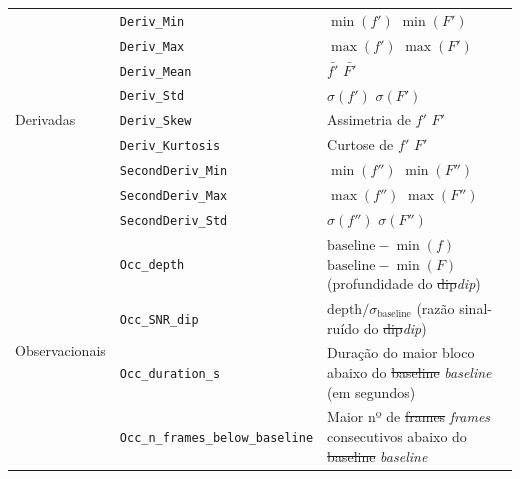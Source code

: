 \documentclass[msc]{on} %
\makeatletter
\providecommand{\DIFaddtex}[1]{{\protect\color{red}#1}} %
\providecommand{\DIFdeltex}[1]{{\protect\color{red}\sout{#1}}} %
\providecommand{\DIFaddFL}[1]{\DIFadd{#1}} %
\providecommand{\DIFdelFL}[1]{\DIFdel{#1}} %
\providecommand{\DIFaddbeginFL}{} %
\providecommand{\DIFaddendFL}{} %
\providecommand{\DIFdelbeginFL}{} %
\providecommand{\DIFdelendFL}{} %
\providecommand{\DIFadd}[1]{\texorpdfstring{\DIFaddtex{#1}}{#1}} %
\providecommand{\DIFdel}[1]{\texorpdfstring{\DIFdeltex{#1}}{}} %
\let\sout@orig\sout %
\renewcommand{\sout}[1]{\ifmmode\text{\sout@orig{\ensuremath{#1}}}\else\sout@orig{#1}\fi} %
\makeatother
\begin{document}
\begin{table}[htbp]
\begin{tabular}{llp{7.5cm}}
\hline
\multirow{9}{*}{Derivadas}
& \texttt{Deriv\_Min} & \DIFdelbeginFL \DIFdelFL{$\min(f')$ }\DIFdelendFL \DIFaddbeginFL \DIFaddFL{$\min(F')$ }\DIFaddendFL \\
& \texttt{Deriv\_Max} & \DIFdelbeginFL \DIFdelFL{$\max(f')$ }\DIFdelendFL \DIFaddbeginFL \DIFaddFL{$\max(F')$ }\DIFaddendFL \\
& \texttt{Deriv\_Mean} & \DIFdelbeginFL \DIFdelFL{$\bar{f'}$ }\DIFdelendFL \DIFaddbeginFL \DIFaddFL{$\bar{F'}$ }\DIFaddendFL \\
& \texttt{Deriv\_Std} & \DIFdelbeginFL \DIFdelFL{$\sigma(f')$ }\DIFdelendFL \DIFaddbeginFL \DIFaddFL{$\sigma(F')$ }\DIFaddendFL \\
& \texttt{Deriv\_Skew} & Assimetria de \DIFdelbeginFL \DIFdelFL{$f'$ }\DIFdelendFL \DIFaddbeginFL \DIFaddFL{$F'$ }\DIFaddendFL \\
& \texttt{Deriv\_Kurtosis} & Curtose de \DIFdelbeginFL \DIFdelFL{$f'$ }\DIFdelendFL \DIFaddbeginFL \DIFaddFL{$F'$ }\DIFaddendFL \\
& \texttt{SecondDeriv\_Min} & \DIFdelbeginFL \DIFdelFL{$\min(f'')$ }\DIFdelendFL \DIFaddbeginFL \DIFaddFL{$\min(F'')$ }\DIFaddendFL \\
& \texttt{SecondDeriv\_Max} & \DIFdelbeginFL \DIFdelFL{$\max(f'')$ }\DIFdelendFL \DIFaddbeginFL \DIFaddFL{$\max(F'')$ }\DIFaddendFL \\
& \texttt{SecondDeriv\_Std} & \DIFdelbeginFL \DIFdelFL{$\sigma(f'')$ }\DIFdelendFL \DIFaddbeginFL \DIFaddFL{$\sigma(F'')$ }\DIFaddendFL \\
\hline
\multirow{10}{*}{Observacionais}
& \texttt{Occ\_depth} & \DIFdelbeginFL \DIFdelFL{$\text{baseline} - \min(f)$ }\DIFdelendFL \DIFaddbeginFL \DIFaddFL{$\text{baseline} - \min(F)$ }\DIFaddendFL (profundidade do \DIFdelbeginFL \DIFdelFL{dip}\DIFdelendFL \DIFaddbeginFL \textit{\DIFaddFL{dip}}\DIFaddendFL ) \\
& \texttt{Occ\_SNR\_dip} & $\text{depth}/\sigma_{\text{baseline}}$ (razão sinal-ruído do \DIFdelbeginFL \DIFdelFL{dip}\DIFdelendFL \DIFaddbeginFL \textit{\DIFaddFL{dip}}\DIFaddendFL ) \\
& \texttt{Occ\_duration\_s} & Duração do maior bloco abaixo do \DIFdelbeginFL \DIFdelFL{baseline }\DIFdelendFL \DIFaddbeginFL \textit{\DIFaddFL{baseline}} \DIFaddendFL (em segundos) \\
& \texttt{Occ\_n\_frames\_below\_baseline} & Maior nº de \DIFdelbeginFL \DIFdelFL{frames }\DIFdelendFL \DIFaddbeginFL \textit{\DIFaddFL{frames}} \DIFaddendFL consecutivos abaixo do \DIFdelbeginFL \DIFdelFL{baseline }\DIFdelendFL \DIFaddbeginFL \textit{\DIFaddFL{baseline}} \DIFaddendFL \\

\end{tabular}
\end{table}
\end{document}
